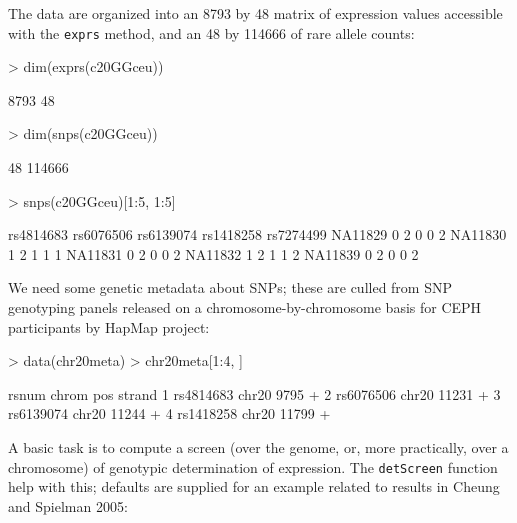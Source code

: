 \documentclass[12pt]{article}
\newcommand{\Rfunction}[1]{{\texttt{#1}}}
\begin{document}
The data are organized into an 8793
by 48 matrix of expression values
accessible with the \texttt{exprs} method, and
an 48 by 114666
of rare allele counts:
\begin{Schunk}
\begin{Sinput}
> dim(exprs(c20GGceu))
\end{Sinput}
\begin{Soutput}
[1] 8793   48
\end{Soutput}
\begin{Sinput}
> dim(snps(c20GGceu))
\end{Sinput}
\begin{Soutput}
[1]     48 114666
\end{Soutput}
\begin{Sinput}
> snps(c20GGceu)[1:5, 1:5]
\end{Sinput}
\begin{Soutput}
        rs4814683 rs6076506 rs6139074 rs1418258 rs7274499
NA11829         0         2         0         0         2
NA11830         1         2         1         1         1
NA11831         0         2         0         0         2
NA11832         1         2         1         1         2
NA11839         0         2         0         0         2
\end{Soutput}
\end{Schunk}

We need some genetic metadata about SNPs; these are
culled from SNP genotyping panels released on a 
chromosome-by-chromosome basis for CEPH participants
by HapMap project:
\begin{Schunk}
\begin{Sinput}
> data(chr20meta)
> chr20meta[1:4, ]
\end{Sinput}
\begin{Soutput}
      rsnum chrom   pos strand
1 rs4814683 chr20  9795      +
2 rs6076506 chr20 11231      +
3 rs6139074 chr20 11244      +
4 rs1418258 chr20 11799      +
\end{Soutput}
\end{Schunk}

A basic task is to compute a screen (over the genome, or,
more practically, over a chromosome) of genotypic determination
of expression.  The \Rfunction{detScreen} function help
with this; defaults are supplied for an example related to
results in Cheung and Spielman 2005:
\end{document}
